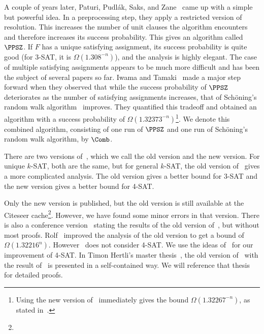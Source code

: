 A couple of years later, Paturi, Pudl\'ak, Saks, and Zane~\cite{ppsz}
came up with a simple but powerful idea. In a preprocessing step, they
apply a restricted version of resolution. This increases the number of
unit clauses the algorithm encounters and therefore increases its
success probability.
This gives an algorithm called $\PPSZ$.  If $F$ has a unique
satisfying assignment, its success probability is quite good (for
$3$-SAT, it is $\Omega(1.308^{-n})$), and the analysis is highly
elegant. The case of multiple satisfying assignments appears to be
much more difficult and has been the subject of several papers so far.
Iwama and Tamaki~\cite{it04} made a major step forward when they
observed that while the success probability of $\PPSZ$ deteriorates as
the number of satisfying assignments increases, that of Sch\"oning's
random walk algorithm~\cite{schoning1999} improves.  They quantified
this tradeoff and obtained an algorithm with a success probability of
$\Omega(1.32373^{-n})$\footnote{Using the new version of~\cite{ppsz} immediately gives the bound $\Omega(1.32267^{-n})$, as stated in~\cite{rolf2006}.}. We denote this combined algorithm, consisting of one run
of $\PPSZ$ and one run of Sch\"oning's random walk algorithm, by $\Comb$.\paragraphprev


There are two versions of~\cite{ppsz}, which we call the old version
and the new version. For unique $k$-SAT, both are the same, but for general
$k$-SAT, the old version of~\cite{ppsz} gives a more complicated
analysis. The old version gives a better bound for 3-SAT and the new version gives a better bound for 4-SAT\@.

Only the new version is published, but the old version is still
available at the Citeseer cache\footnote{}.
However, we have found some minor errors in that version.  There is also a
conference version~\cite{ppszconference} stating the results of the old
version of~\cite{ppsz}, but without most proofs. 
Rolf~\cite{rolf2006} improved the analysis of the old version to get a bound of $\Omega(1.32216^n)$. However~\cite{rolf2006} does not consider 4-SAT\@. We use the ideas of~\cite{rolf2006} for our improvement
of 4-SAT\@.
In Timon Hertli's
master thesis~\cite{thesis}, the old version of~\cite{ppsz} with the
result of~\cite{rolf2006} is presented in a self-contained way. We will reference that thesis for detailed proofs.


